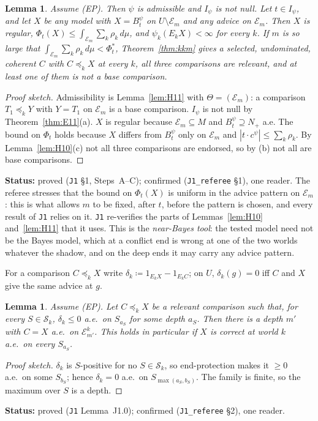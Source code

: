 \documentclass[11pt]{article}
\newtheorem{lemma}[theorem]{Lemma}
\theoremstyle{definition}
\theoremstyle{remark}
\newcommand{\src}[1]{\texttt{#1}}
\newcommand{\status}[1]{\par\smallskip\noindent\textbf{Status:} #1\par\smallskip}
\begin{document}
\begin{lemma}\label{lem:J1C}
Assume (EP). Then $\psi$ is admissible and $I_\psi$ is not null. Let $t\in I_\psi$, and let $X$ be any model with $X=B^\psi_t$ on $U\setminus\mathcal E_m$ and any advice on $\mathcal E_m$. Then $X$ is regular, $\Phi_t(X)\le\int_{\mathcal E_m}\sum_k\rho_k\,d\mu$, and $\psi_k(E_kX)<\infty$ for every $k$. If $m$ is so large that $\int_{\mathcal E_m}\sum_k\rho_k\,d\mu<\Phi^*_t$, Theorem~\ref{thm:kkm} gives a selected, undominated, coherent $C$ with $C\preceq_kX$ at every $k$, all three comparisons are relevant, and at least one of them is not a base comparison.
\end{lemma}
\begin{proof}[Proof sketch]
Admissibility is Lemma~\ref{lem:H11} with $\Theta=(\mathcal E_m)$: a comparison $T_1\preceq_kY$ with $Y=T_1$ on $\mathcal E_m$ is a base comparison. $I_\psi$ is not null by Theorem~\ref{thm:E11}(a). $X$ is regular because $\mathcal E_m\subseteq M$ and $B^\psi_t\supseteq N_+$ a.e. The bound on $\Phi_t$ holds because $X$ differs from $B^\psi_t$ only on $\mathcal E_m$ and $|t\cdot c^\psi|\le\sum_k\rho_k$. By Lemma~\ref{lem:H10}(c) not all three comparisons are endorsed, so by (b) not all are base comparisons.
\end{proof}
\status{proved (\src{J1} \S1, Steps~A--C); confirmed (\src{J1\_referee} \S1), one reader. The referee stresses that the bound on $\Phi_t(X)$ is uniform in the advice pattern on $\mathcal E_m$: this is what allows $m$ to be fixed, after $t$, before the pattern is chosen, and every result of \src{J1} relies on it. \src{J1} re-verifies the parts of Lemmas~\ref{lem:H10} and~\ref{lem:H11} that it uses. This is the \emph{near-Bayes tool}: the tested model need not be the Bayes model, which at a conflict end is wrong at one of the two worlds whatever the shadow, and on the deep ends it may carry any advice pattern.}

For a comparison $C\preceq_kX$ write $\delta_k\coloneqq1_{E_kX}-1_{E_kC}$; on $U$, $\delta_k(g)=0$ iff $C$ and $X$ give the same advice at $g$.

\begin{lemma}\label{lem:J10}
Assume (EP). Let $C\preceq_kX$ be a relevant comparison such that, for every $S\in\mathcal S_k$, $\delta_k\le0$ a.e.\ on $S_{a_S}$ for some depth $a_S$. Then there is a depth $m'$ with $C=X$ a.e.\ on $\mathcal E^k_{m'}$. This holds in particular if $X$ is correct at world $k$ a.e.\ on every $S_{a_S}$.
\end{lemma}
\begin{proof}[Proof sketch]
$\delta_k$ is $S$-positive for no $S\in\mathcal S_k$, so end-protection makes it $\ge0$ a.e.\ on some $S_{b_S}$; hence $\delta_k=0$ a.e.\ on $S_{\max(a_S,b_S)}$. The family is finite, so the maximum over $S$ is a depth.
\end{proof}
\status{proved (\src{J1} Lemma~J1.0); confirmed (\src{J1\_referee} \S2), one reader.}
\end{document}
